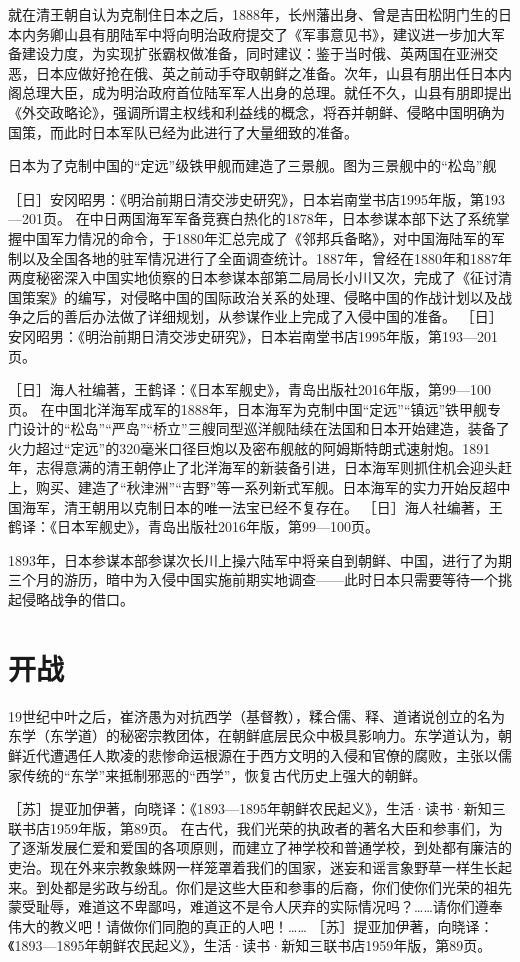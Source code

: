 \documentclass[12pt,UTF8]{ctexbook}
\begin{document}
就在清王朝自认为克制住日本之后，1888年，长州藩出身、曾是吉田松阴门生的日本内务卿山县有朋陆军中将向明治政府提交了《军事意见书》，建议进一步加大军备建设力度，为实现扩张霸权做准备，同时建议：鉴于当时俄、英两国在亚洲交恶，日本应做好抢在俄、英之前动手夺取朝鲜之准备。次年，山县有朋出任日本内阁总理大臣，成为明治政府首位陆军军人出身的总理。就任不久，山县有朋即提出《外交政略论》，强调所谓主权线和利益线的概念，将吞并朝鲜、侵略中国明确为国策，而此时日本军队已经为此进行了大量细致的准备。


日本为了克制中国的“定远”级铁甲舰而建造了三景舰。图为三景舰中的“松岛”舰

［日］安冈昭男：《明治前期日清交涉史研究》，日本岩南堂书店1995年版，第193—201页。
在中日两国海军军备竞赛白热化的1878年，日本参谋本部下达了系统掌握中国军力情况的命令，于1880年汇总完成了《邻邦兵备略》，对中国海陆军的军制以及全国各地的驻军情况进行了全面调查统计。1887年，曾经在1880年和1887年两度秘密深入中国实地侦察的日本参谋本部第二局局长小川又次，完成了《征讨清国策案》的编写，对侵略中国的国际政治关系的处理、侵略中国的作战计划以及战争之后的善后办法做了详细规划，从参谋作业上完成了入侵中国的准备。 ［日］安冈昭男：《明治前期日清交涉史研究》，日本岩南堂书店1995年版，第193—201页。

［日］海人社编著，王鹤译：《日本军舰史》，青岛出版社2016年版，第99—100页。
在中国北洋海军成军的1888年，日本海军为克制中国“定远”“镇远”铁甲舰专门设计的“松岛”“严岛”“桥立”三艘同型巡洋舰陆续在法国和日本开始建造，装备了火力超过“定远”的320毫米口径巨炮以及密布舰舷的阿姆斯特朗式速射炮。1891年，志得意满的清王朝停止了北洋海军的新装备引进，日本海军则抓住机会迎头赶上，购买、建造了“秋津洲”“吉野”等一系列新式军舰。日本海军的实力开始反超中国海军，清王朝用以克制日本的唯一法宝已经不复存在。 ［日］海人社编著，王鹤译：《日本军舰史》，青岛出版社2016年版，第99—100页。

1893年，日本参谋本部参谋次长川上操六陆军中将亲自到朝鲜、中国，进行了为期三个月的游历，暗中为入侵中国实施前期实地调查——此时日本只需要等待一个挑起侵略战争的借口。

\section{开战}

19世纪中叶之后，崔济愚为对抗西学（基督教），糅合儒、释、道诸说创立的名为东学（东学道）的秘密宗教团体，在朝鲜底层民众中极具影响力。东学道认为，朝鲜近代遭遇任人欺凌的悲惨命运根源在于西方文明的入侵和官僚的腐败，主张以儒家传统的“东学”来抵制邪恶的“西学”，恢复古代历史上强大的朝鲜。

［苏］提亚加伊著，向晓译：《1893—1895年朝鲜农民起义》，生活·读书·新知三联书店1959年版，第89页。
在古代，我们光荣的执政者的著名大臣和参事们，为了逐渐发展仁爱和爱国的各项原则，而建立了神学校和普通学校，到处都有廉洁的吏治。现在外来宗教象蛛网一样笼罩着我们的国家，迷妄和谣言象野草一样生长起来。到处都是劣政与纷乱。你们是这些大臣和参事的后裔，你们使你们光荣的祖先蒙受耻辱，难道这不卑鄙吗，难道这不是令人厌弃的实际情况吗？……请你们遵奉伟大的教义吧！请做你们同胞的真正的人吧！…… ［苏］提亚加伊著，向晓译：《1893—1895年朝鲜农民起义》，生活·读书·新知三联书店1959年版，第89页。
\end{document}
